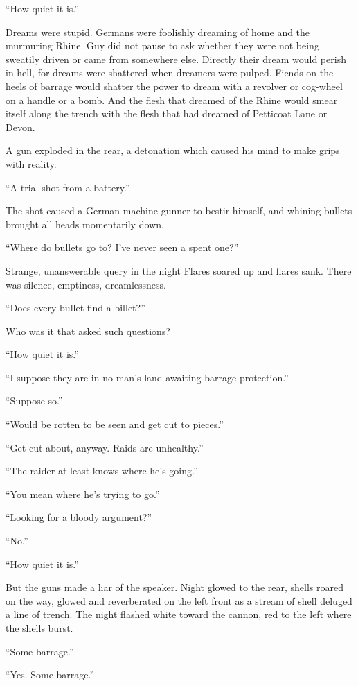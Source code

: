 ``How quiet it is.''

Dreams were stupid. Germans were foolishly dreaming of home and the murmuring Rhine. Guy did not pause to ask whether they were not being sweatily driven or came from somewhere else. Directly their dream would perish in hell, for dreams were shattered when dreamers were pulped. Fiends on the heels of barrage would shatter the power to dream with a revolver or cog-wheel on a handle or a bomb. And the flesh that dreamed of the Rhine would smear itself along the trench with the flesh that had dreamed of Petticoat Lane or Devon.

A gun exploded in the rear, a detonation which caused his mind to make grips with reality.

``A trial shot from a battery.''

The shot caused a German machine-gunner to bestir himself, and whining bullets brought all heads momentarily down.

``Where do bullets go to? I've never seen a spent one?''

Strange, unanswerable query in the night Flares soared up and flares sank. There was silence, emptiness, dreamlessness.

``Does every bullet find a billet?''

Who was it that asked such questions?

``How quiet it is.''

``I suppose they are in no-man's-land awaiting barrage protection.''

``Suppose so.''

``Would be rotten to be seen and get cut to pieces.''

``Get cut about, anyway. Raids are unhealthy.''

``The raider at least knows where he's going.''

``You mean where he's trying to go.''

``Looking for a bloody argument?''

``No.''

``How quiet it is.''

But the guns made a liar of the speaker. Night glowed to the rear, shells roared on the way, glowed and reverberated on the left front as a stream of shell deluged a line of trench. The night flashed white toward the cannon, red to the left where the shells burst.

``Some barrage.''

``Yes. Some barrage.''

